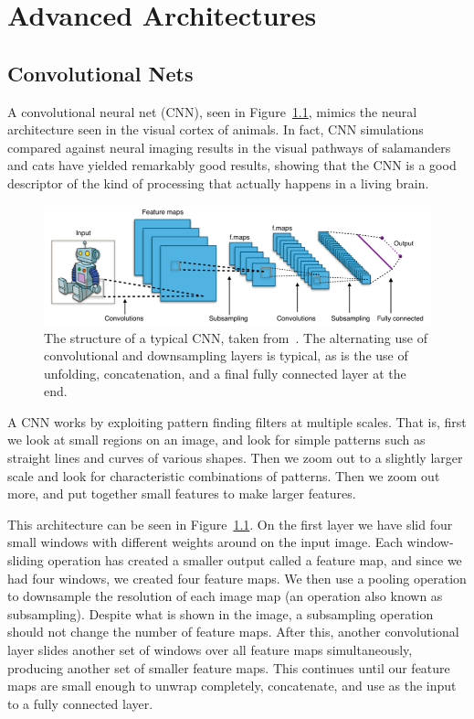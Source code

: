 \chapter{Advanced Architectures}\label{sec:advanced_architectures}

\section{Convolutional Nets}

A convolutional neural net (CNN), seen in Figure~\ref{fig:CNN_architecture}, mimics the neural architecture seen in the visual cortex of animals. In fact, CNN simulations compared against neural imaging results in the visual pathways of salamanders and cats have yielded remarkably good results, showing that the CNN is a good descriptor of the kind of processing that actually happens in a living brain.

\begin{figure}[htbp]
    \centering
    \includegraphics[width=\linewidth]{Images/ML/CNN_architecture.png}
    \caption{The structure of a typical CNN, taken from~\cite{CNN_architecture}. The alternating use of convolutional and downsampling layers is typical, as is the use of unfolding, concatenation, and a final fully connected layer at the end.}
    \label{fig:CNN_architecture}
\end{figure}

A CNN works by exploiting pattern finding filters at multiple scales. That is, first we look at small regions on an image, and look for simple patterns such as straight lines and curves of various shapes. Then we zoom out to a slightly larger scale and look for characteristic combinations of patterns. Then we zoom out more, and put together small features to make larger features.

This architecture can be seen in Figure~\ref{fig:CNN_architecture}. On the first layer we have slid four small windows with different weights around on the input image. Each window-sliding operation has created a smaller output called a feature map, and since we had four windows, we created four feature maps. We then use a pooling operation to downsample the resolution of each image map (an operation also known as subsampling). Despite what is shown in the image, a subsampling operation should not change the number of feature maps. After this, another convolutional layer slides another set of windows over all feature maps simultaneously, producing another set of smaller feature maps. This continues until our feature maps are small enough to unwrap completely, concatenate, and use as the input to a fully connected layer.

